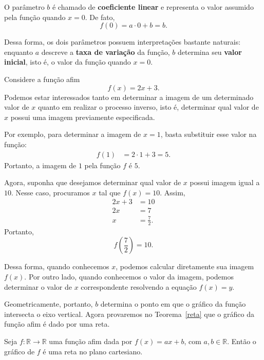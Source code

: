 O parâmetro $b$ é chamado de \textbf{coeficiente linear} e representa o valor assumido pela função quando $x=0$. De fato,
\begin{equation*}
    f(0)=a\cdot0+b=b.
\end{equation*}

Dessa forma, os dois parâmetros possuem interpretações bastante naturais: enquanto $a$ descreve a \textbf{taxa de variação} da função, $b$ determina seu \textbf{valor inicial}, isto é, o valor da função quando $x=0$.

\begin{example}
    Considere a função afim
    \begin{equation*}
        f(x)=2x+3.
    \end{equation*}
    Podemos estar interessados tanto em determinar a imagem de um determinado valor de $x$ quanto em realizar o processo inverso, isto é, determinar qual valor de $x$ possui uma imagem previamente especificada.

    Por exemplo, para determinar a imagem de $x=1$, basta substituir esse valor na função:
    \begin{align*}
        f(1)&=2\cdot1+3=5.
    \end{align*}
    Portanto, a imagem de $1$ pela função $f$ é $5$.

    Agora, suponha que desejamos determinar qual valor de $x$ possui imagem igual a $10$. Nesse caso, procuramos $x$ tal que $f(x)=10$. Assim,
    \begin{align*}
        2x+3&=10 \\
        2x&=7 \\
        x&=\frac{7}{2}.
    \end{align*}
    Portanto,
    \begin{equation*}
        f\left(\frac{7}{2}\right)=10.
    \end{equation*}

    Dessa forma, quando conhecemos $x$, podemos calcular diretamente sua imagem $f(x)$. Por outro lado, quando conhecemos o valor da imagem, podemos determinar o valor de $x$ correspondente resolvendo a equação $f(x)=y$.
\end{example}


Geometricamente, portanto, $b$ determina o ponto em que o gráfico da função intersecta o eixo vertical. Agora provaremos no Teorema~\ref{reta}  que o gráfico da função afim é dado por uma reta. 

\begin{teo}
\label{reta}
    Seja $f:\mathbb{R}\to\mathbb{R}$ uma função afim dada por $f(x)=ax+b$, com $a,b\in\mathbb{R}$. Então o gráfico de $f$ é uma reta no plano cartesiano.
\end{teo}

